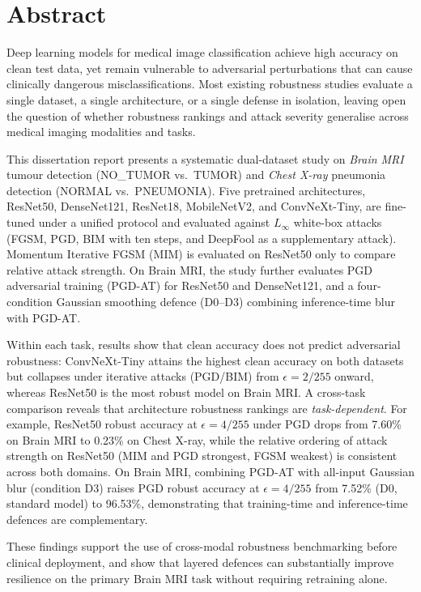 \documentclass[12pt,a4paper,oneside]{report}
\renewcommand{\abstractname}{Abstract}
\begin{document}
\chapter*{\abstractname}
\addcontentsline{toc}{chapter}{\abstractname}

Deep learning models for medical image classification achieve high accuracy on clean test data, yet remain vulnerable to adversarial perturbations that can cause clinically dangerous misclassifications. Most existing robustness studies evaluate a single dataset, a single architecture, or a single defense in isolation, leaving open the question of whether robustness rankings and attack severity generalise across medical imaging modalities and tasks.

This dissertation report presents a systematic dual-dataset study on \emph{Brain MRI} tumour detection (NO\_TUMOR vs.\ TUMOR) and \emph{Chest X-ray} pneumonia detection (NORMAL vs.\ PNEUMONIA). Five pretrained architectures, ResNet50, DenseNet121, ResNet18, MobileNetV2, and ConvNeXt-Tiny, are fine-tuned under a unified protocol and evaluated against $L_\infty$ white-box attacks (FGSM, PGD, BIM with ten steps, and DeepFool as a supplementary attack). Momentum Iterative FGSM (MIM) is evaluated on ResNet50 only to compare relative attack strength. On Brain MRI, the study further evaluates PGD adversarial training (PGD-AT) for ResNet50 and DenseNet121, and a four-condition Gaussian smoothing defence (D0--D3) combining inference-time blur with PGD-AT.

Within each task, results show that clean accuracy does not predict adversarial robustness: ConvNeXt-Tiny attains the highest clean accuracy on both datasets but collapses under iterative attacks (PGD/BIM) from $\epsilon = 2/255$ onward, whereas ResNet50 is the most robust model on Brain MRI. A cross-task comparison reveals that architecture robustness rankings are \emph{task-dependent}. For example, ResNet50 robust accuracy at $\epsilon = 4/255$ under PGD drops from 7.60\% on Brain MRI to 0.23\% on Chest X-ray, while the relative ordering of attack strength on ResNet50 (MIM and PGD strongest, FGSM weakest) is consistent across both domains. On Brain MRI, combining PGD-AT with all-input Gaussian blur (condition D3) raises PGD robust accuracy at $\epsilon = 4/255$ from 7.52\% (D0, standard model) to 96.53\%, demonstrating that training-time and inference-time defences are complementary.

These findings support the use of cross-modal robustness benchmarking before clinical deployment, and show that layered defences can substantially improve resilience on the primary Brain MRI task without requiring retraining alone.
\end{document}
